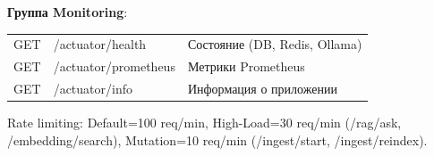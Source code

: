{\textbf{Группа Monitoring}:
\begin{center}
\begin{tabular}{|l|l|l|}
\hline
GET & /actuator/health & Состояние (DB, Redis, Ollama) \\
GET & /actuator/prometheus & Метрики Prometheus \\
GET & /actuator/info & Информация о приложении \\
\hline
\end{tabular}
\end{center}

Rate limiting: Default=100 req/min, High-Load=30 req/min (/rag/ask, /embedding/search), Mutation=10 req/min (/ingest/start, /ingest/reindex).}
